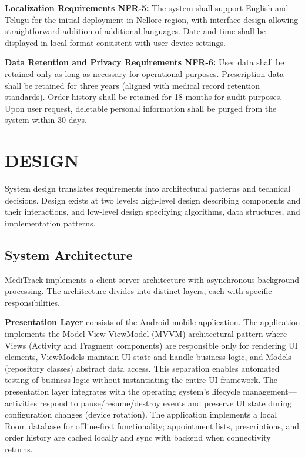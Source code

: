 \documentclass[12pt,a4paper]{report}
\begin{document}
\textbf{Localization Requirements NFR-5:} The system shall support English and Telugu for the initial deployment in Nellore region, with interface design allowing straightforward addition of additional languages. Date and time shall be displayed in local format consistent with user device settings.

\textbf{Data Retention and Privacy Requirements NFR-6:} User data shall be retained only as long as necessary for operational purposes. Prescription data shall be retained for three years (aligned with medical record retention standards). Order history shall be retained for 18 months for audit purposes. Upon user request, deletable personal information shall be purged from the system within 30 days.

\section{DESIGN}

System design translates requirements into architectural patterns and technical decisions. Design exists at two levels: high-level design describing components and their interactions, and low-level design specifying algorithms, data structures, and implementation patterns.

\subsection{System Architecture}

MediTrack implements a client-server architecture with asynchronous background processing. The architecture divides into distinct layers, each with specific responsibilities.

\textbf{Presentation Layer} consists of the Android mobile application. The application implements the Model-View-ViewModel (MVVM) architectural pattern where Views (Activity and Fragment components) are responsible only for rendering UI elements, ViewModels maintain UI state and handle business logic, and Models (repository classes) abstract data access. This separation enables automated testing of business logic without instantiating the entire UI framework. The presentation layer integrates with the operating system's lifecycle management—activities respond to pause/resume/destroy events and preserve UI state during configuration changes (device rotation). The application implements a local Room database for offline-first functionality; appointment lists, prescriptions, and order history are cached locally and sync with backend when connectivity returns.
\end{document}
